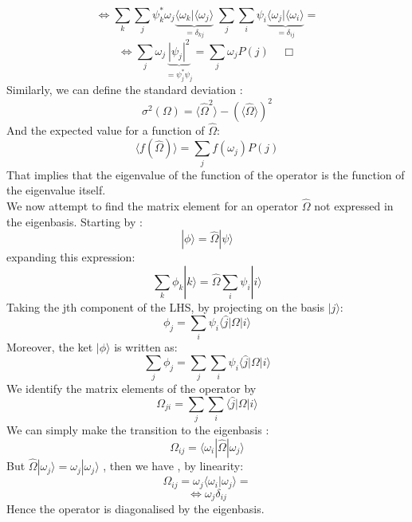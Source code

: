    \[
 \Leftrightarrow  \sum_{k} \sum_j \psi^*_k \omega_j \underbrace{\langle \omega_k|\langle \omega_j \rangle}_{= \delta_{kj}} \;  \sum_{j}\sum_i \psi_i \underbrace{ \langle \omega_j |\langle \omega_ i \rangle}_{= \delta_{ij}}=
   \]   \[
\Leftrightarrow  \sum_j \omega_j \underbrace{| \psi_j|^ 2}_{= \psi^*_j \psi_j} = \sum_j \omega_j  P(j) \; \; \; \;\Box
   \]
 Similarly, we can define the standard deviation :
 \[
 \sigma^ 2 ( \Omega) = \langle \hat{\Omega}^ 2\rangle - \left( \langle \hat{\Omega}\rangle\right) ^ 2
 \]
 And the expected value for a function of $ \hat{\Omega}$:
 \[
 \langle f( \hat{\Omega})\rangle = \sum_j f(\omega_j) P(j)
 \]
 That implies that the eigenvalue of the function of the operator is the function of the eigenvalue itself.\\
 We now attempt to find the matrix element for an operator $ \hat{\Omega}$ not expressed in the eigenbasis. Starting by :
 \[
 | \phi \rangle =  \hat{\Omega} |\psi \rangle 
 \]
 expanding this expression:
 \[
 \sum_k \phi_k | k \rangle = \hat{\Omega} \sum_i \psi_i | i\rangle 
 \]
 Taking the jth component of the LHS, by projecting on the basis $ | j \rangle$:
 \[
 \phi_j = \sum_i \psi_i \langle \hat j|{\Omega}| i\rangle
 \] 
 Moreover, the ket $| \phi \rangle$ is written as:
 \[
\sum_j \phi_j = \sum_j\sum_i \psi_i \langle \hat j|{\Omega}| i\rangle
 \] 
 We identify the matrix elements of the operator by
 \[
 \Omega_{ji} = \sum_j\sum_i  \langle \hat j|{\Omega}| i\rangle
 \]
 We can simply make the transition to the eigenbasis :
 \[
 \Omega_{ij} = \langle \omega_i| \hat{\Omega}| \omega_j\rangle
 \]
 But $ \hat{\Omega}| \omega_j\rangle = \omega_j | \omega_j \rangle $ , then we have , by linearity:
 \[
  \Omega_{ij} = \omega_j \langle \omega_i|  \omega_j\rangle =
 \]
 \[
 \Leftrightarrow \omega_j \delta_{ij}
 \]
 Hence the operator is diagonalised by the eigenbasis.
 



